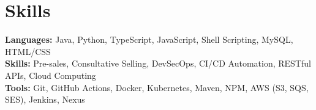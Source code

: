 \documentclass[11pt]{article}       %
\begin{document}
\section*{Skills}
\textbf{Languages:} Java, Python, TypeScript, JavaScript, Shell Scripting, MySQL, HTML/CSS\\
\textbf{Skills:} Pre-sales, Consultative Selling, DevSecOps, CI/CD Automation, RESTful APIs, Cloud Computing\\
\textbf{Tools:} Git, GitHub Actions, Docker, Kubernetes, Maven, NPM, AWS (S3, SQS, SES), Jenkins, Nexus\\

\vspace{-6.5pt}
\end{document}
